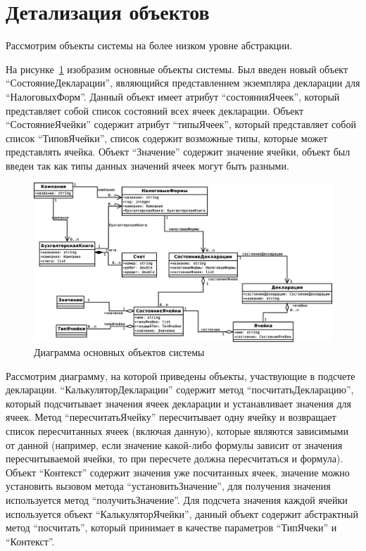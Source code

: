 \documentclass[14pt,a4paper]{reportmod}
\begin{document}
\section{Детализация объектов}
Рассмотрим объекты системы на более низком уровне абстракции.

На рисунке~\ref{pic:classes_1} изобразим основные объекты системы. Был введен новый объект ``СостояниеДекларации'', являющийся представлением экземпляра декларации для ``НалоговыхФорм''. Данный объект имеет атрибут ``состоянияЯчеек'', который представляет собой список состояний всех ячеек декларации. Объект ``СостояниеЯчейки'' содержит атрибут ``типыЯчеек'', который представляет собой список ``ТиповЯчейки'', список содержит возможные типы, которые может представлять ячейка. Объект ``Значение'' содержит значение ячейки, объект был введен так как типы данных значений ячеек могут быть разными.

\begin{figure}
  \centering
  \includegraphics[scale=0.4]{uml/_classes_1}
  \caption{Диаграмма основных объектов системы}
  \label{pic:classes_1}
\end{figure}

Рассмотрим диаграмму, на которой приведены объекты, участвующие в подсчете декларации. ``КалькуляторДекларации'' содержит метод ``посчитатьДекларацию'', который подсчитывает значения ячеек декларации и устанавливает значения для ячеек. Метод ``пересчитатьЯчейку'' пересчитывает одну ячейку и возвращает список пересчитанных ячеек (включая данную), которые являются зависимыми от данной (например, если значение какой-либо формулы зависит от значения пересчитываемой ячейки, то при пересчете должна пересчитаться и формула). Объект ``Контекст''  содержит значения уже посчитанных ячеек, значение можно установить вызовом метода ``установитьЗначение'', для получения значения используется метод ``получитьЗначение''. Для подсчета значения каждой ячейки используется объект ``КалькуляторЯчейки'', данный объект содержит абстрактный метод ``посчитать'', который принимает в качестве параметров ``ТипЯчеки'' и ``Контекст''.
\end{document}
